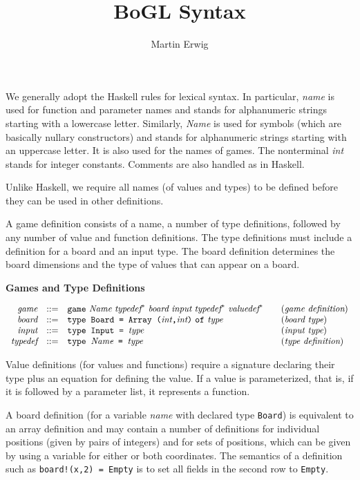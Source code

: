 \documentclass[11pt]{article}
\makeatletter
\newcommand{\prodName}[1]{&(\emph{#1})\\}
\newcommand{\nt}[1]{\textit{#1}}
\newcommand{\prog}[1]{\texttt{#1}}
\newcommand{\IS}{&::=&}
\newcommand{\syntax}[2]{
  \needspace{3\baselineskip}
  \bigskip\par\noindent\textbf{#1}\par\smallskip%
  $\begin{array}{rcl@{\qquad}l}#2\end{array}$%
  \par\bigskip\noindent\ignorespaces
}
\newcommand{\lp}{\prog{(}}
\newcommand{\rp}{\prog{)}}
\newcommand{\paren}[1]{\lp#1\rp}
\newcommand{\pair}[2]{\paren{#1\prog{,}#2}}
\makeatother
\begin{document}
\title{BoGL Syntax}
\author{Martin Erwig}
\maketitle

\noindent
%
We generally adopt the Haskell rules for lexical syntax. In particular,
\nt{name} is used for function and parameter names and stands for alphanumeric
strings starting with a lowercase letter.
%
Similarly, \nt{Name} is used for symbols (which are basically nullary
constructors) and stands for alphanumeric strings starting with an uppercase
letter. It is also used for the names of games.
%
The nonterminal \nt{int} stands for integer constants.
%
Comments are also handled as in Haskell.

Unlike Haskell, we require all names (of values and types) to be defined before
they can be used in other definitions.

A game definition consists of a name, a number of type definitions, followed by
any number of value and function definitions. The type definitions must include
a definition for a board and an input type.
%
The board definition determines the board dimensions and the type of values
that can appear on a board.

\syntax{Games and Type Definitions}{
\nt{game}    \IS  \prog{game}\ \nt{Name}
                  \ \nt{typedef}^*
                  \ \nt{board}\ \nt{input}
                  \ \nt{typedef}^*
                  \ \nt{valuedef}^*
                                                     \prodName{game definition}
\nt{board}   \IS  \prog{type Board = Array }\pair{\nt{int}}{\nt{int}}\
                  \prog{of}\ \nt{type}                \prodName{board type}
\nt{input}   \IS  \prog{type Input = }\nt{type}      \prodName{input type}
\nt{typedef} \IS  \prog{type }\nt{Name}\prog{ = }\nt{type}      \prodName{type definition}
}
%
Value definitions (for values and functions) require a signature declaring
their type plus an equation for defining the value. If a value is
parameterized, that is, if it is followed by a parameter list, it represents a
function.

A board definition (for a variable \nt{name} with declared type \prog{Board})
is equivalent to an array definition and may contain a number of definitions
for individual positions (given by pairs of integers) and for sets of
positions, which can be given by using a variable for either or both
coordinates. The semantics of a definition such as \prog{board!(x,2)~=~Empty}
is to set all fields in the second row to \prog{Empty}.
\end{document}
